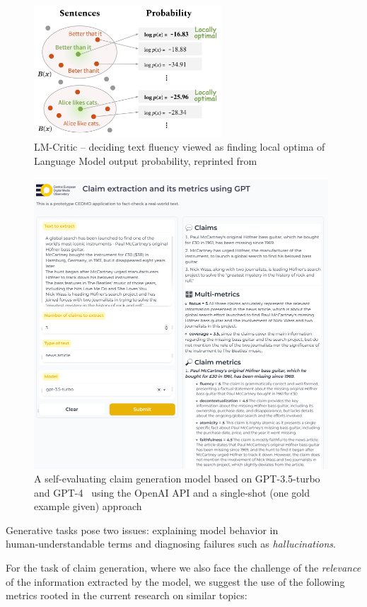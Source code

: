 \begin{figure}
    \includegraphics[width=7cm]{fig/lm_critics.png}
    \caption{\textsf{LM-Critic} -- deciding text fluency viewed as finding local optima of Language Model output probability, reprinted from~\cite{yasunaga-etal-2021-lm}}
    \label{fig:lmcritic}
\end{figure}

\begin{figure}
    \includegraphics[width=11cm]{fig/gptext.pdf}
    \caption{A self-evaluating claim generation model based on GPT-3.5-turbo and GPT-4~\cite{gpt4} using the \textsf{OpenAI API} and a single-shot (one gold example given) approach}
    \label{fig:gptext}
\end{figure}
Generative tasks pose two issues: explaining model behavior in human‑understandable terms and diagnosing failures such as \textit{hallucinations}.

For the task of claim generation, where we also face the challenge of the \textit{relevance} of the information extracted by the model, we suggest the use of the following metrics rooted in the current research on similar topics:

